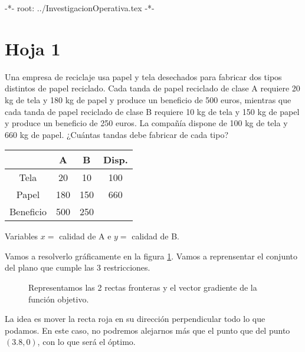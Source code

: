  -*- root: ../InvestigacionOperativa.tex -*-

\section{Hoja 1}

\begin{problem}[1]

Una empresa de reciclaje usa papel y tela desechados para fabricar dos tipos distintos de papel reciclado.
Cada tanda de papel reciclado de clase A requiere 20 kg de tela y 180 kg de papel y produce un beneficio de 500 euros, mientras que cada tanda de papel reciclado de clase B requiere 10 kg de tela y 150 kg de papel y produce un beneficio de 250 euros. 
La compañía dispone de 100 kg de tela y 660 kg de papel. ¿Cuántas tandas debe fabricar de cada tipo?

\solution

\begin{center}
\begin{tabular}{c|ccc}
& A & B & Disp. \\\hline
Tela & 20 & 10 & 100\\
Papel & 180 & 150 & 660\\
Beneficio & 500 & 250 & 
\end{tabular}
\end{center}

Variables $x = $ calidad de A e $y = $ calidad de B.

\begin{ioprob}
\end{ioprob}

Vamos a resolverlo gráficamente en la figura \ref{ej:1.1.a}. Vamos a reprensentar el conjunto del plano que cumple las 3 restricciones.


\begin{figure}[hbtp]
\centering
{}
\label{ej:1.1.a}
\caption{Representamos las 2 rectas fronteras y el vector gradiente de la función objetivo.}
\end{figure}


La idea es mover la recta roja en su dirección perpendicular todo lo que podamos. En este caso, no podremos alejarnos más que el punto que del punto $(3.8,0)$, con lo que será el óptimo.

\end{problem}


